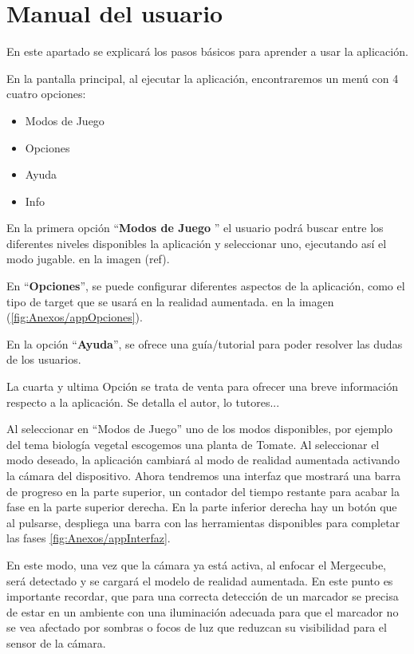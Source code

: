 \section{Manual del usuario}

En este apartado se explicará los pasos básicos para aprender a usar la aplicación.

En la pantalla principal, al ejecutar la aplicación, encontraremos un menú con 4 cuatro opciones: 
\begin{itemize}
	\item Modos de Juego
	\item Opciones
	\item Ayuda
	\item Info
\end{itemize}


En la primera opción ``\textbf{Modos de Juego} '' el usuario podrá buscar entre los diferentes niveles disponibles la aplicación y seleccionar uno, ejecutando así el modo jugable. en la imagen (ref).

En ``\textbf{Opciones}'', se puede configurar diferentes aspectos de la aplicación, como el tipo de target que se usará en la realidad aumentada. en la imagen (\ref{fig:Anexos/appOpciones}).


En la opción ``\textbf{Ayuda}'', se ofrece una guía/tutorial para poder resolver las dudas de los usuarios.

La cuarta y ultima Opción se trata de venta para ofrecer una breve información respecto a la aplicación. Se detalla el autor, lo tutores... 



Al seleccionar en ``Modos de Juego'' uno de los modos disponibles, por ejemplo del tema biología vegetal escogemos una planta de Tomate.
Al seleccionar el modo deseado, la aplicación cambiará al modo de realidad aumentada activando la cámara del dispositivo. Ahora tendremos una interfaz que mostrará una barra de progreso en la parte superior, un contador del tiempo restante para acabar la fase en la parte superior derecha. En la parte inferior derecha hay un botón que al pulsarse, despliega una barra con las herramientas disponibles para completar las fases \ref{fig:Anexos/appInterfaz}.

En este modo, una vez que la cámara ya está activa, al enfocar el Mergecube, será detectado y se cargará el modelo de realidad aumentada. En este punto es importante recordar, que para una correcta detección de un marcador se precisa de estar en un ambiente con una iluminación adecuada para que el marcador no se vea afectado por sombras o focos de luz que reduzcan su visibilidad para el sensor de la cámara.

